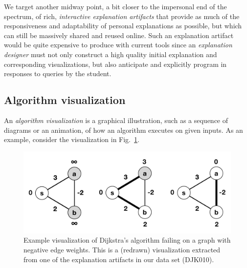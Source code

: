\documentclass[conference]{IEEEtran}
\begin{document}
We target another midway point, a bit closer to the impersonal end of the
spectrum, of rich, \emph{interactive explanation artifacts} that provide as
much of the responsiveness and adaptability of personal explanations as
possible, but which can still be massively shared and reused online. Such an
explanation artifact would be quite expensive to produce with current tools
since an \emph{explanation designer} must not only construct a high quality
initial explanation and corresponding visualizations, but also anticipate and
explicitly program in responses to queries by the student.




\subsection{Algorithm visualization}
\label{sec:vis}


An \emph{algorithm visualization} is a graphical illustration, such as a
sequence of diagrams or an animation, of how an algorithm executes on given
inputs. As an example, consider the visualization in
Fig.~\ref{fig:negative-dijkstra}.

\begin{figure}
\centering
\includegraphics[width=0.9\columnwidth]{VisDJK010-Clean}
\caption{Example visualization of Dijkstra's algorithm failing on a graph with
negative edge weights. This is a (redrawn) visualization extracted from one of
the explanation artifacts in our data set (DJK010).}
\label{fig:negative-dijkstra}
\end{figure}
\end{document}
